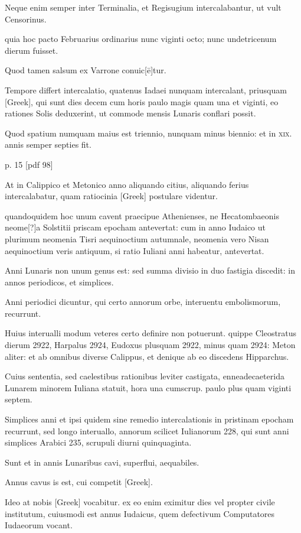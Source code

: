 Neque enim semper inter
Terminalia, et Regisugium intercalabantur, ut vult Censorinus.

quia hoc pacto Februarius ordinarius nunc viginti octo; nunc undetricenum
dierum fuisset.

Quod tamen salsum ex Varrone conuic[ē]tur.

Tempore differt intercalatio, quatenus Iadaei nunquam intercalant,
priusquam \textgreek{[Greek]}, qui sunt dies decem cum horis paulo
magis quam una et viginti, eo rationes Solis deduxerint, ut commode
mensis Lunaris conflari possit.

Quod spatium numquam maius est
triennio, nunquam minus biennio: et in \textsc{xix}. annis semper septies fit.


p. 15 [pdf 98]

At in Calippico et Metonico anno aliquando citius, aliquando ferius
intercalabatur, quam ratiocinia \textgreek{[Greek]} postulare videntur.

quandoquidem hoc unum cavent praecipue Athenienses, ne Hecatombaeonis
neome[?]a Solstitii priscam epocham antevertat: cum in
anno Iudaico ut plurimum neomenia Tisri aequinoctium autumnale,
neomenia vero Nisan aequinoctium veris antiquum, si ratio Iuliani
anni habeatur, antevertat.

Anni Lunaris non unum genus est: sed
summa divisio in duo fastigia discedit: in annos periodicos, et simplices.

Anni periodici dicuntur, qui certo annorum orbe, interuentu
embolismorum, recurrunt.

Huius interualli modum veteres certo
definire non potuerunt. quippe Cleostratus dierum 2922, Harpalus
2924, Eudoxus plusquam 2922, minus quam 2924: Meton aliter:
et ab omnibus diverse Calippus, et denique ab eo discedens Hipparchus.

Cuius sententia, sed caelestibus rationibus leviter castigata, enneadecaeterida
Lunarem minorem Iuliana statuit, hora una cumscrup. paulo
plus quam viginti septem.

Simplices anni et ipsi quidem sine remedio
intercalationis in pristinam epocham recurrunt, sed longo interuallo,
annorum scilicet Iulianorum 228, qui sunt anni simplices Arabici 235,
scrupuli diurni quinquaginta.

Sunt et in annis Lunaribus cavi, superflui,
aequabiles.

Annus cavus is est, cui competit \textgreek{[Greek]}.

Ideo at nobis \textgreek{[Greek]} vocabitur. ex eo enim eximitur dies
vel propter civile institutum, cuiusmodi est annus Iudaicus,
quem defectivum
Computatores Iudaeorum vocant.

